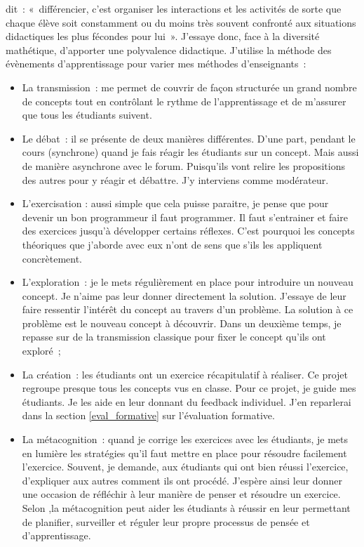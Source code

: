 \citet{perrenoud1992differenciation} dit~: «~différencier, c’est organiser les interactions et les activités de sorte que chaque élève soit constamment ou du moins très souvent confronté aux situations didactiques les plus fécondes pour lui~». J’essaye donc, face à la diversité mathétique, d’apporter une polyvalence didactique. J'utilise la méthode des évènements d’apprentissage\cite{leclercq2008modele} pour varier mes méthodes d'enseignants~:
\begin{itemize}
    \item La transmission~: me permet de couvrir de façon structurée un grand nombre de concepts tout en contrôlant le rythme de l'apprentissage et de m'assurer que tous les étudiants suivent.
    \item Le débat~: il se présente de deux manières différentes. D'une part, pendant le cours (synchrone) quand je fais réagir les étudiants sur un concept. Mais aussi de manière asynchrone avec le forum. Puisqu'ils vont relire les propositions des autres pour y réagir et débattre. J'y interviens comme modérateur.
    \item L'exercisation : aussi simple que cela puisse paraitre, je pense que pour devenir un bon programmeur il faut programmer. Il faut s'entrainer et faire des exercices jusqu'à développer certains réflexes. C'est pourquoi les concepts théoriques que j'aborde avec eux n'ont de sens que s'ils les appliquent concrètement.
    \item L'exploration~: je le mets régulièrement en place pour introduire un nouveau concept. Je n'aime pas leur donner directement la solution. J'essaye de leur faire ressentir l'intérêt du concept au travers d'un problème. La solution à ce problème est le nouveau concept à découvrir. Dans un deuxième temps, je repasse sur de la transmission classique pour fixer le concept qu'ils ont exploré~;
    \item La création~: les étudiants ont un exercice récapitulatif à réaliser. Ce projet regroupe presque tous les concepts vus en classe. Pour ce projet, je guide mes étudiants. Je les aide en leur donnant du feedback individuel. J'en reparlerai dans la section \ref{eval_formative} sur l'évaluation formative.
    \item La métacognition~: quand je corrige les exercices avec les étudiants, je mets en lumière les stratégies qu'il faut mettre en place pour résoudre facilement l'exercice. Souvent, je demande, aux étudiants qui ont bien réussi l'exercice, d'expliquer aux autres comment ils ont procédé. J'espère ainsi leur donner une occasion de réfléchir à leur manière de penser et résoudre un exercice. Selon \citet{dunlosky2013improving},la métacognition peut aider les étudiants à réussir en leur permettant de planifier, surveiller et réguler leur propre processus de pensée et d'apprentissage.
\end{itemize}
